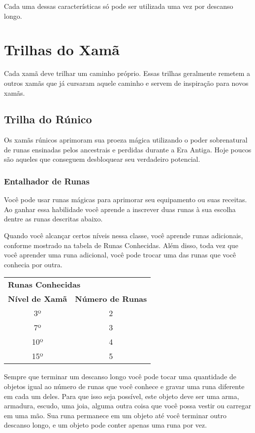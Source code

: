 \begin{multicols}{2}
Cada uma dessas características só pode ser utilizada uma vez por descanso
longo.

\section*{Trilhas do Xamã}%

Cada xamã deve trilhar um caminho próprio. Essas trilhas geralmente remetem a
outros xamãs que já cursaram aquele caminho e servem de inspiração para novos
xamãs.

\subsection*{Trilha do Rúnico}%

Os xamãs rúnicos aprimoram sua proeza mágica utilizando o poder sobrenatural de
runas ensinadas pelos ancestrais e perdidas durante a Era Antiga. Hoje poucos
são aqueles que conseguem desbloquear seu verdadeiro potencial.

\subsubsection*{Entalhador de Runas}%

Você pode usar runas mágicas para aprimorar seu equipamento ou suas receitas. Ao
ganhar essa habilidade você aprende a inscrever duas runas à sua escolha dentre
as runas descritas abaixo.

Quando você alcançar certos níveis nessa classe, você aprende runas adicionais,
conforme mostrado na tabela de Runas Conhecidas. Além disso, toda vez que você
aprender uma runa adicional, você pode trocar uma das runas que você conhecia
por outra.

\begin{tabular}{c c}
\multicolumn{2}{l}{\textbf{\Large Runas Conhecidas}} \\
\textbf{Nível de Xamã} & \textbf{Número de Runas} \\
3º & 2 \\
7º & 3 \\
10º & 4 \\
15º & 5 \\
\end{tabular}

Sempre que terminar um descanso longo você pode tocar uma quantidade de objetos
igual ao número de runas que você conhece e gravar uma runa diferente em cada um
deles. Para que isso seja possível, este objeto deve ser uma arma, armadura,
escudo, uma joia, alguma outra coisa que você possa vestir ou carregar em uma
mão. Sua runa permanece em um objeto até você terminar outro descanso longo, e
um objeto pode conter apenas uma runa por vez.


\end{multicols}
